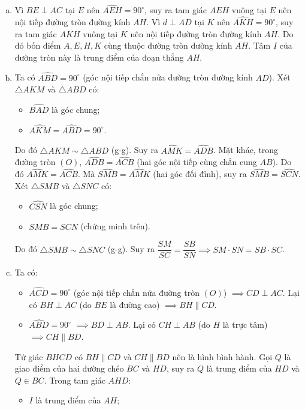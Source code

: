 \begin{bt}
{\begin{enumerate}[a)]
	\item Vì $BE \perp AC$ tại $E$ nên $\widehat{AEH} = 90^\circ$, suy ra tam giác $AEH$ vuông tại $E$ nên nội tiếp đường tròn đường kính $AH$.
	Vì $d \perp AD$ tại $K$ nên $\widehat{AKH} = 90^\circ$, suy ra tam giác $AKH$ vuông tại $K$ nên nội tiếp đường tròn đường kính $AH$.
	Do đó bốn điểm $A, E, H, K$ cùng thuộc đường tròn đường kính $AH$.
	Tâm $I$ của đường tròn này là trung điểm của đoạn thẳng $AH$.
	\item Ta có $\widehat{ABD} = 90^\circ$ (góc nội tiếp chắn nửa đường tròn đường kính $AD$).
	Xét $\triangle AKM$ và $\triangle ABD$ có:
	\begin{itemize}
		\item $\widehat{BAD}$ là góc chung;
		\item $\widehat{AKM} = \widehat{ABD} = 90^\circ$.
	\end{itemize}
	Do đó $\triangle AKM \sim \triangle ABD$ (g-g).
	Suy ra $\widehat{AMK} = \widehat{ADB}$.
	Mặt khác, trong đường tròn $(O)$, $\widehat{ADB} = \widehat{ACB}$ (hai góc nội tiếp cùng chắn cung $AB$).
	Do đó $\widehat{AMK} = \widehat{ACB}$.
	Mà $\widehat{SMB} = \widehat{AMK}$ (hai góc đối đỉnh), suy ra $\widehat{SMB} = \widehat{SCN}$.
	Xét $\triangle SMB$ và $\triangle SNC$ có:
	\begin{itemize}
		\item $\widehat{CSN}$ là góc chung;
		\item $\widehat{SMB} = \widehat{SCN}$ (chứng minh trên).
	\end{itemize}
	Do đó $\triangle SMB \sim \triangle SNC$ (g-g).
	Suy ra $\dfrac{SM}{SC} = \dfrac{SB}{SN} \implies SM \cdot SN = SB \cdot SC$.
	\item Ta có:
	\begin{itemize}
		\item $\widehat{ACD} = 90^\circ$ (góc nội tiếp chắn nửa đường tròn $(O)$) $\implies CD \perp AC$.
		Lại có $BH \perp AC$ (do $BE$ là đường cao) $\implies BH \parallel CD$.
		\item $\widehat{ABD} = 90^\circ$ $\implies BD \perp AB$.
		Lại có $CH \perp AB$ (do $H$ là trực tâm) $\implies CH \parallel BD$.
	\end{itemize}
	Tứ giác $BHCD$ có $BH \parallel CD$ và $CH \parallel BD$ nên là hình bình hành.
	Gọi $Q$ là giao điểm của hai đường chéo $BC$ và $HD$, suy ra $Q$ là trung điểm của $HD$ và $Q \in BC$.
	Trong tam giác $AHD$:
	\begin{itemize}
		\item $I$ là trung điểm của $AH$;

\end{itemize}
\end{enumerate}}
\end{bt}
